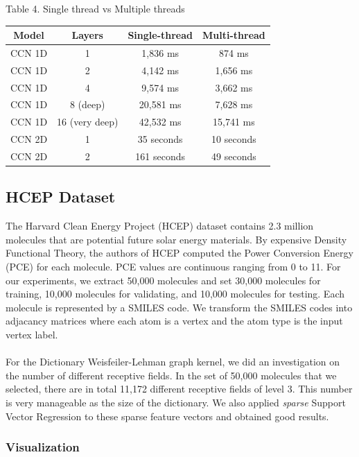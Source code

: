 \documentclass[a4paper]{article}
\begin{document}
\begin{center}
Table 4. Single thread vs Multiple threads
\begin{tabular}{|| c | c | c | c ||}	
	\hline
	Model & Layers & Single-thread & Multi-thread \\
	\hline\hline
	CCN 1D & 1 & 1,836 ms & 874 ms \\
	\hline
	CCN 1D & 2 & 4,142 ms & 1,656 ms\\
	\hline
	CCN 1D & 4 & 9,574 ms & 3,662 ms \\
	\hline
	CCN 1D & 8 (deep) & 20,581 ms & 7,628 ms \\
	\hline
	CCN 1D & 16 (very deep) & 42,532 ms & 15,741 ms\\
	\hline
	CCN 2D & 1 & 35 seconds & 10 seconds \\
	\hline
	CCN 2D & 2 & 161 seconds & 49 seconds \\
	\hline
\end{tabular}
\end{center}

\subsection{HCEP Dataset}

The Harvard Clean Energy Project (HCEP) dataset \cite{Johannes} contains 2.3 million molecules that are potential future solar energy materials. By expensive Density Functional Theory, the authors of HCEP computed the Power Conversion Energy (PCE) for each molecule. PCE values are continuous ranging from 0 to 11. For our experiments, we extract 50,000 molecules and set 30,000 molecules for training, 10,000 molecules for validating, and 10,000 molecules for testing. Each molecule is represented by a SMILES code. We transform the SMILES codes into adjacancy matrices where each atom is a vertex and the atom type is the input vertex label. \\ \\
For the Dictionary Weisfeiler-Lehman graph kernel, we did an investigation on the number of different receptive fields. In the set of 50,000 molecules that we selected, there are in total 11,172 different receptive fields of level 3. This number is very manageable as the size of the dictionary. We also applied \textit{sparse} Support Vector Regression to these sparse feature vectors and obtained good results.

\subsubsection{Visualization}
\end{document}
